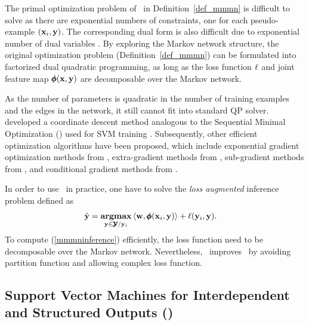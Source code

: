 {The primal optimization problem of \mmmn\ in Definition~\ref{def_mmmn} is difficult to solve as there are exponential numbers of constraints, one for each pseudo-example $(\mathbf {x}_i,\mathbf {y})$.
The corresponding dual form is also difficult due to exponential number of dual variables \citep{Taskar04max}.
By exploring the Markov network structure, the original optimization problem (Definition~\ref{def_mmmn}) can be formulated into factorized dual quadratic programming, as long as the loss function $\mathbf {\ell}$ and joint feature map $\pmb \phi(\mathbf {x},\mathbf {y})$ are decomposable over the Markov network.

As the number of parameters is quadratic in the number of training examples and the edges in the network, it still cannot fit into standard QP solver. 
\citep{Taskar04max} developed a coordinate descent method analogous to the Sequential Minimal Optimization (\smo) used for SVM training \citep{Platt98sequential,Platt99fast}.
Subsequently, other efficient optimization algorithms have been proposed, which include exponential gradient optimization methods from \citet{bartlett04}, extra-gradient methods from \citet{taskar06}, sub-gradient methods from \citet{Ratliff07}, and conditional gradient methods from \citet{Rousu06, Rousu07}.

In order to use \mmmn\ in practice, one have to solve the \textit{loss augmented} inference problem defined as
\begin{align}
	\hat{\mathbf {y}} = \underset{\mathbf {y}\in\pmb {\mathcal{Y}}/\mathbf {y}_i}{\textbf{argmax}} &\, \langle \mathbf {w}, \pmb \phi(\mathbf {x}_i,\mathbf {y}) \rangle + \mathbf {\ell}(\mathbf {y}_i,\mathbf {y}) \label{mmmninference}.
\end{align} 
To compute (\ref{mmmninference}) efficiently, the loss function need to be decomposable over the Markov network.
Nevertheless, \mmmn\ improves \crf\ by avoiding partition function and allowing complex loss function.


%
% 
\subsection{Support Vector Machines for Interdependent and Structured Outputs (\svmstruct)} \label{sc_svmstruct}

}
